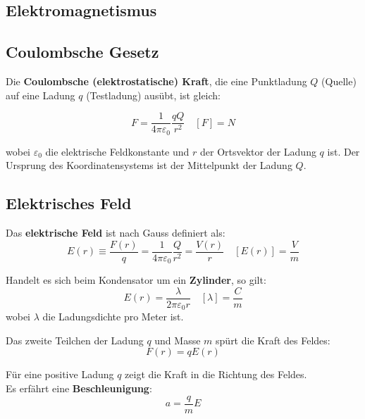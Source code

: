 \documentclass[7pt]{article}
\begin{document}
\begin{multicols*}{3}
	
\section{Elektromagnetismus}

\subsection{Coulombsche Gesetz}

Die \textbf{Coulombsche (elektrostatische) Kraft}, die eine Punktladung $Q$ (Quelle) auf eine Ladung $q$ (Testladung) aus{\"u}bt, ist gleich:

\begin{equation*}
	F = \frac{1}{4\pi\varepsilon_0}\frac{qQ}{r^2} \quad [F] = N
\end{equation*}

wobei $\varepsilon_0$ die elektrische Feldkonstante und $r$ der Ortsvektor der Ladung $q$ ist. Der Ursprung des Koordinatensystems ist der Mittelpunkt der Ladung $Q$. \\

\subsection{Elektrisches Feld}

Das \textbf{elektrische Feld} ist nach Gauss definiert als:
\begin{equation*}
	E(r) \equiv \frac{F(r)}{q} = \frac{1}{4\pi\varepsilon_0}\frac{Q}{r^2} = \frac{V(r)}{r} \quad[E(r)] = \frac{V}{m}
\end{equation*}

Handelt es sich beim Kondensator um ein \textbf{Zylinder}, so gilt:
\begin{equation*}
	E(r)=\frac {\lambda }{2\pi \varepsilon_0 r} \quad [\lambda] = \frac{C}{m}
\end{equation*}
wobei $\lambda$ die Ladungsdichte pro Meter ist.

Das zweite Teilchen der Ladung $q$ und Masse $m$ sp{\"u}rt die Kraft des Feldes:
\begin{equation*}
	F(r) = qE(r)
\end{equation*}

F{\"u}r eine positive Ladung $q$ zeigt die Kraft in die Richtung des Feldes. \\

Es erf{\"a}hrt eine \textbf{Beschleunigung}:
\begin{equation*}
	a = \frac{q}{m}E
\end{equation*}


\end{multicols*}
\end{document}
